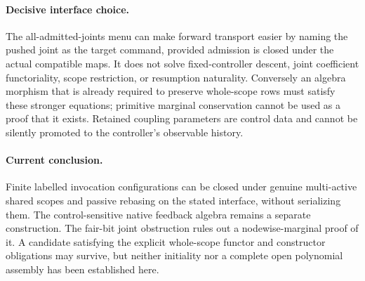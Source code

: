 \documentclass[11pt]{article}
\begin{document}
\paragraph{Decisive interface choice.} The all-admitted-joints menu can make forward transport easier by naming the pushed joint as the target command, provided admission is closed under the actual compatible maps. It does not solve fixed-controller descent, joint coefficient functoriality, scope restriction, or resumption naturality. Conversely an algebra morphism that is already required to preserve whole-scope rows must satisfy these stronger equations; primitive marginal conservation cannot be used as a proof that it exists. Retained coupling parameters are control data and cannot be silently promoted to the controller's observable history.

\paragraph{Current conclusion.} Finite labelled invocation configurations can be closed under genuine multi-active shared scopes and passive rebasing on the stated interface, without serializing them. The control-sensitive native feedback algebra remains a separate construction. The fair-bit joint obstruction rules out a nodewise-marginal proof of it. A candidate satisfying the explicit whole-scope functor and constructor obligations may survive, but neither initiality nor a complete open polynomial assembly has been established here.
\end{document}
